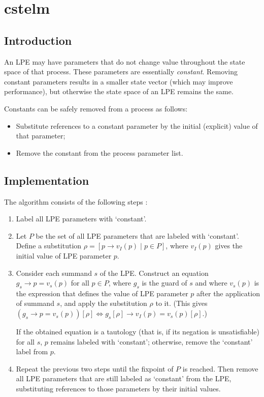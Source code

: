 \chapter{cstelm}

\section{Introduction}

An LPE may have parameters that do not change value throughout the state space of that process.
These parameters are essentially \emph{constant}.
Removing constant parameters results in a smaller state vector (which may improve performance), but otherwise the state space of an LPE remains the same.

Constants can be safely removed from a process as follows:
\begin{itemize}
\item Substitute references to a constant parameter by the initial (explicit) value of that parameter;
\item Remove the constant from the process parameter list.
\end{itemize}

\section{Implementation}

The algorithm consists of the following steps \cite{groote2001computer}:

\begin{enumerate}

\item Label all LPE parameters with `constant'.

\item Let $P$ be the set of all LPE parameters that are labeled with `constant'.
Define a substitution $\rho = [p \rightarrow v_I(p) \;|\; p \in P]$, where $v_I(p)$ gives the initial value of LPE parameter $p$.

\item Consider each summand $s$ of the LPE.
Construct an equation $g_s \rightarrow p = v_s(p)$ for all $p \in P$, where $g_s$ is the guard of $s$ and where $v_s(p)$ is the expression that defines the value of LPE parameter $p$ after the application of summand $s$, and apply the substitution $\rho$ to it.
(This gives $(g_s \rightarrow p = v_s(p))[\rho] \Leftrightarrow {g_s}[\rho] \rightarrow v_I(p) = v_s(p)[\rho]$.)

If the obtained equation is a tautology (that is, if its negation is unsatisfiable) for all $s$, $p$ remains labeled with `constant'; otherwise, remove the `constant' label from $p$.

\item Repeat the previous two steps until the fixpoint of $P$ is reached.
Then remove all LPE parameters that are still labeled as `constant' from the LPE, substituting references to those parameters by their initial values.

\end{enumerate}

